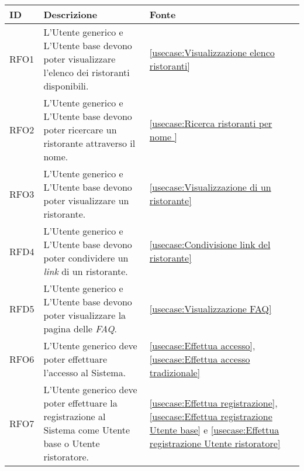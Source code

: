 \begin{table}[H]
	\renewcommand{\arraystretch}{1.5}
	\centering
	\begin{tabularx}{\textwidth}{l|X|p{2cm}}
		\textbf{ID} & \textbf{Descrizione}                                                                                       & \textbf{Fonte}                                                                                                                                               \\
		\hline
		RFO1        & L'Utente generico e L'Utente base devono poter visualizzare l'elenco dei ristoranti disponibili.           & \autoref{usecase:Visualizzazione elenco ristoranti}                                                                                                          \\
		\hline
		RFO2        & L'Utente generico e L'Utente base devono poter ricercare un ristorante attraverso il nome.				  & \autoref{usecase:Ricerca ristoranti per nome }                                                                                                                      \\
		\hline
		RFO3        & L'Utente generico e L'Utente base devono poter visualizzare un ristorante.                                 & \autoref{usecase:Visualizzazione di un ristorante}                                                                                                           \\
		\hline
		RFD4        & L'Utente generico e L'Utente base devono poter condividere un \textit{link} di un ristorante.              & \autoref{usecase:Condivisione link del ristorante}                                                                                                           \\
		\hline
		RFD5        & L'Utente generico e L'Utente base devono poter visualizzare la pagina delle  \textit{\ac{FAQ}}.            & \autoref{usecase:Visualizzazione FAQ}                                                                                                                        \\
		\hline
		RFO6        & L'Utente generico deve poter effettuare l'accesso al Sistema.                                              & \autoref{usecase:Effettua accesso}, \autoref{usecase:Effettua accesso tradizionale}                      \\
		\hline
		RFO7        & L'Utente generico deve poter effettuare la registrazione al Sistema come Utente base o Utente ristoratore. & \autoref{usecase:Effettua registrazione}, \autoref{usecase:Effettua registrazione Utente base} e \autoref{usecase:Effettua registrazione Utente ristoratore} \\

\end{tabularx}
\end{table}
